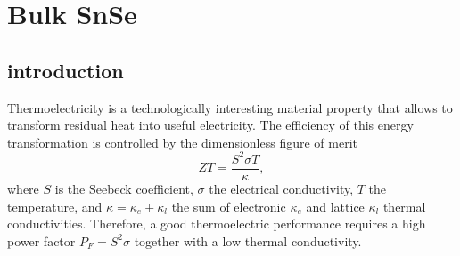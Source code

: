 
\chapter{Bulk SnSe} %

\label{Chapter5} %




\section{introduction}

Thermoelectricity is a technologically interesting material property that allows to transform residual heat into useful electricity\cite{goldsmid2010introduction,behnia2015fundamentals}. The efficiency of this energy 
transformation is controlled by the dimensionless figure of merit
\begin{equation}
ZT=\frac{S^{2}\sigma T}{\kappa},
\end{equation}
where $S$ is the Seebeck coefficient, $\sigma$ the electrical conductivity, $T$ the temperature, and $\kappa=\kappa_{e}+\kappa_{l}$ the sum of electronic $\kappa_{e}$ and lattice $\kappa_{l}$ thermal conductivities. Therefore, a 
good thermoelectric performance requires a high power factor $P_{F}=S^{2}\sigma$ together with a low thermal conductivity. \\

